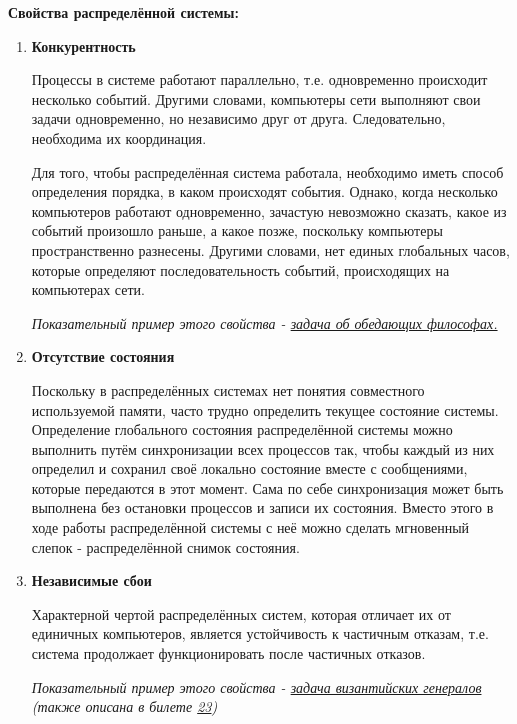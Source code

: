 \textbf{ Свойства распределённой системы:}
\begin{enumerate}
\item \textbf{Конкурентность}

Процессы в системе работают параллельно, т.е. одновременно происходит несколько событий. Другими словами, компьютеры сети выполняют свои задачи одновременно, но независимо друг от друга. Следовательно, необходима их координация.

Для того, чтобы распределённая система работала, необходимо иметь способ определения порядка, в каком происходят события. Однако, когда несколько компьютеров работают одновременно, зачастую невозможно сказать, какое из событий произошло раньше, а какое позже, поскольку компьютеры пространственно разнесены. Другими словами, нет единых глобальных часов, которые определяют последовательность событий, происходящих на компьютерах сети.

\textit{Показательный пример этого свойства - \textcolor{blue}{\href{https://clck.ru/puqyK}{задача об обедающих философах.}}}

\item \textbf{ Отсутствие состояния}

Поскольку в распределённых системах нет понятия совместного используемой памяти, часто трудно определить текущее состояние системы. Определение глобального состояния распределённой системы можно выполнить путём синхронизации всех процессов так, чтобы каждый из них определил и сохранил своё локально состояние вместе с сообщениями, которые передаются в этот момент. Сама по себе синхронизация может быть выполнена без остановки процессов и записи их состояния. Вместо этого в ходе работы распределённой системы с неё можно сделать мгновенный слепок - распределённой снимок состояния.

\item \textbf{ Независимые сбои}

Характерной чертой распределённых систем, которая отличает их от единичных компьютеров, является устойчивость к частичным отказам, т.е. система продолжает функционировать после частичных отказов.

\textit{Показательный пример этого свойства - \textcolor{blue}{\href{https://clck.ru/JVS7z}{задача византийских генералов}} (также описана в билете \hyperlink{Byzantine_fault}{23})}
\end{enumerate}

